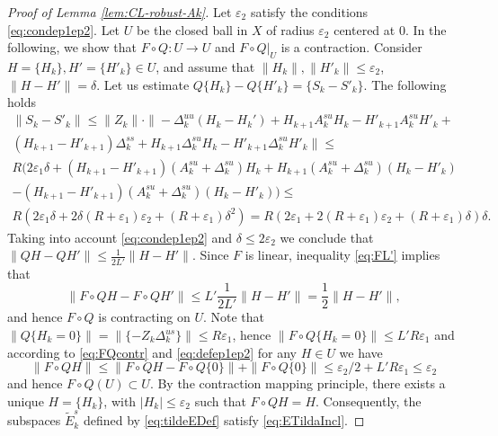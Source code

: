 \documentclass[12pt]{article}
\theoremstyle{definition}
\begin{document}
\begin{proof}[Proof of Lemma \ref{lem:CL-robust-Ak}]
Let $\varepsilon_2$ satisfy the conditions \eqref{eq:condep1ep2}. Let $U$ be the closed ball in $X$ of radius $\varepsilon_2$ centered at $0$. In the following, we show that $F \circ Q : U \to U$ and $F \circ Q|_{U}$ is a contraction.
Consider $H = \{H_k\}, H' = \{H'_k\} \in U$, and assume that
$
\|H_k\|, \|H'_k\| \leq \varepsilon_2$, $\|H-H'\| = \delta
$.
Let us estimate $Q\{H_k\} - Q\{H'_k\} = \{S_k - S'_k\}$. The following holds
\begin{multline*}
    \|S_k - S'_k\| \leq 
    \|Z_k\| \cdot \|-\Delta_k^{uu}(H_k-H_k') + H_{k+1}A_k^{su}H_k -H'_{k+1}A_k^{su}H'_k + \\ (H_{k+1}-H'_{k+1})\Delta_k^{ss} + H_{k+1}\Delta_k^{su}H_k - H'_{k+1}\Delta_k^{su}H'_k\| \leq \\
    R(2\varepsilon_1 \delta + (H_{k+1}-H'_{k+1})(A_k^{su}+\Delta_k^{su})H_k +  H_{k+1}(A_k^{su}+\Delta_k^{su})(H_k-H'_k) \\ - (H_{k+1}-H'_{k+1})(A_k^{su}+\Delta_k^{su})(H_k-H'_k)) \leq \\
    R(2 \varepsilon_1 \delta + 2\delta(R+\varepsilon_1)\varepsilon_2 + (R+\varepsilon_1)\delta^2 ) = R(2\varepsilon_1 + 2(R+\varepsilon_1)\varepsilon_2 + (R+\varepsilon_1)\delta)\delta.
\end{multline*}
Taking into account \eqref{eq:condep1ep2} and $\delta \leq 2\varepsilon_2$ we conclude that
$
\|QH - QH'\| \leq \frac{1}{2L'}\|H-H'\|.
$
Since $F$ is linear, inequality \eqref{eq:FL'} implies that 
\begin{equation}\label{eq:FQcontr}
\|F \circ QH - F \circ QH'\| \leq L'\frac{1}{2L'}\|H-H'\| = \frac{1}{2}\|H-H'\|,    
\end{equation}
and hence $F \circ Q$ is contracting on $U$. 
Note that 
$\|Q\{H_k = 0\}\| = \|\{-Z_k\Delta_k^{us}\}\| \leq R\varepsilon_1$, hence
$
\|F \circ Q\{H_k = 0\}\| \leq L'R\varepsilon_1
$
and according to \eqref{eq:FQcontr} and \eqref{eq:defep1ep2} for any $H \in U$ we have
$$
\|F \circ Q H\| \leq
\|F\circ QH-F\circ Q\{0\}\|+\|F\circ Q\{0\}\| \leq \varepsilon_2/2 + L'R\varepsilon_1 \leq \varepsilon_2
$$
and hence $F \circ Q(U) \subset U$. By the contraction mapping principle, there exists a unique $H = \{H_k\}$, with $|H_k| \leq \varepsilon_2$ such that $F \circ Q H = H$. Consequently, the subspaces $\tilde{E}_k^s$ defined by \eqref{eq:tildeEDef} satisfy \eqref{eq:ETildaIncl}.


\end{proof}
\end{document}
